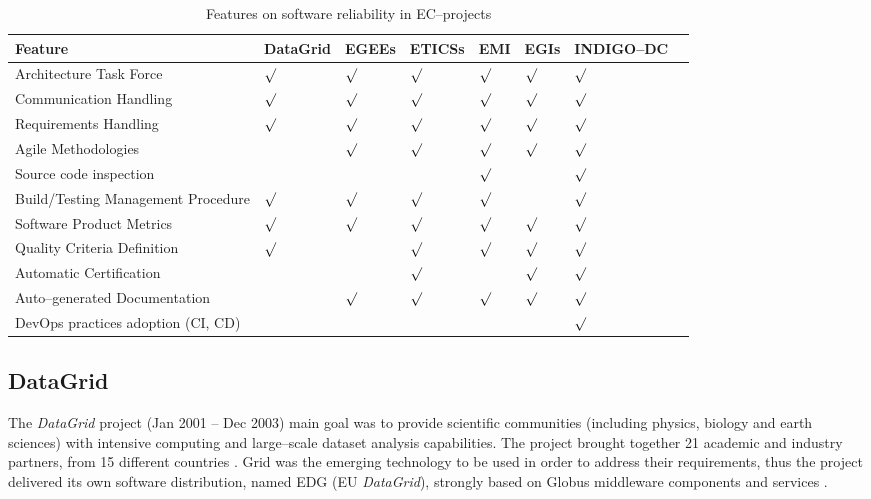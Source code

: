 \begin{table}[!h]
\renewcommand{\arraystretch}{1.3}
\caption{Features on software reliability in EC--projects}
\label{tab:feat}
\centering
\begin{tabular}{p{2.6cm}lllllll}
\hline
\hline
Feature & DataGrid & EGEEs & ETICSs & EMI & EGIs & INDIGO--DC\\
\hline
\hline
Architecture Task Force            &$\surd$&$\surd$&$\surd$&$\surd$&$\surd$&$\surd$\\
Communication Handling             &$\surd$&$\surd$&$\surd$&$\surd$&$\surd$&$\surd$\\
Requirements Handling              &$\surd$&$\surd$&$\surd$&$\surd$&$\surd$&$\surd$\\
Agile Methodologies                &       &$\surd$&$\surd$&$\surd$&$\surd$&$\surd$\\
Source code inspection             &       &       &       &$\surd$&       &$\surd$\\
Build/Testing Management Procedure &$\surd$&$\surd$&$\surd$&$\surd$&       &$\surd$\\
Software Product Metrics           &$\surd$&$\surd$&$\surd$&$\surd$&$\surd$&$\surd$\\
Quality Criteria Definition        &$\surd$&       &$\surd$&$\surd$&$\surd$&$\surd$\\
Automatic Certification            &       &       &$\surd$&       &$\surd$&$\surd$\\
Auto--generated Documentation      &       &$\surd$&$\surd$&$\surd$&$\surd$&$\surd$\\
DevOps practices adoption (CI, CD) &       &       &       &       &       &$\surd$\\
\hline
\hline
\end{tabular}
\end{table}

\subsection{DataGrid}

The {\sl DataGrid} \cite{cordis:datagrid} project (Jan 2001 -- Dec 2003)
main goal was to provide scientific communities (including physics, biology and
earth sciences) with intensive computing and large--scale dataset analysis capabilities.
The project brought together 21 academic and industry partners, from 15 different countries \cite{gagliardi}.
Grid was the emerging technology to be used in order to address their requirements,
thus the project delivered its own software distribution, named EDG (EU {\sl DataGrid}), strongly
based on Globus middleware components and services \cite{globus}. 

